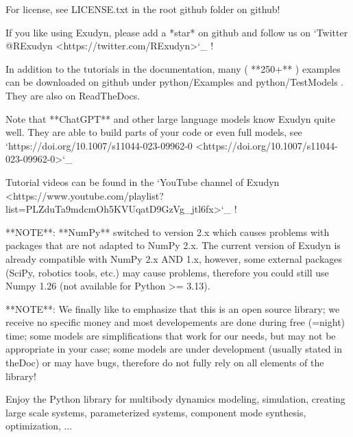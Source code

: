 {For license, see LICENSE.txt in the root github folder on github!

If you like using Exudyn, please add a *star* on github and follow us on 
`Twitter @RExudyn <https://twitter.com/RExudyn>`_ !

In addition to the tutorials in the documentation, many ( **250+** ) examples can be downloaded on github under python/Examples and python/TestModels . They are also on ReadTheDocs.

Note that **ChatGPT** and other large language models know Exudyn quite well. They are able to build parts of your code or even full models, see `https://doi.org/10.1007/s11044-023-09962-0 <https://doi.org/10.1007/s11044-023-09962-0>`_

Tutorial videos can be found in the `YouTube channel of Exudyn <https://www.youtube.com/playlist?list=PLZduTa9mdcmOh5KVUqatD9GzVg_jtl6fx>`_ !

**NOTE**: **NumPy** switched to version 2.x which causes problems with packages that are not adapted to NumPy 2.x. 
The current version of Exudyn is already compatible with NumPy 2.x AND 1.x, however, some external packages (SciPy, robotics tools, etc.) may cause problems, therefore you could still use Numpy 1.26 (not available for Python >= 3.13).

**NOTE**: We finally like to emphasize that this is an open source library; we receive no specific money and most developements are done during free (=night) time; some models are simplifications that work for our needs, but may not be appropriate in your case; some models are under development (usually stated in theDoc) or may have bugs, therefore do not fully rely on all elements of the library!

Enjoy the Python library for multibody dynamics modeling, simulation, creating large scale systems, parameterized systems, component mode synthesis, optimization, ...

}

%
%

